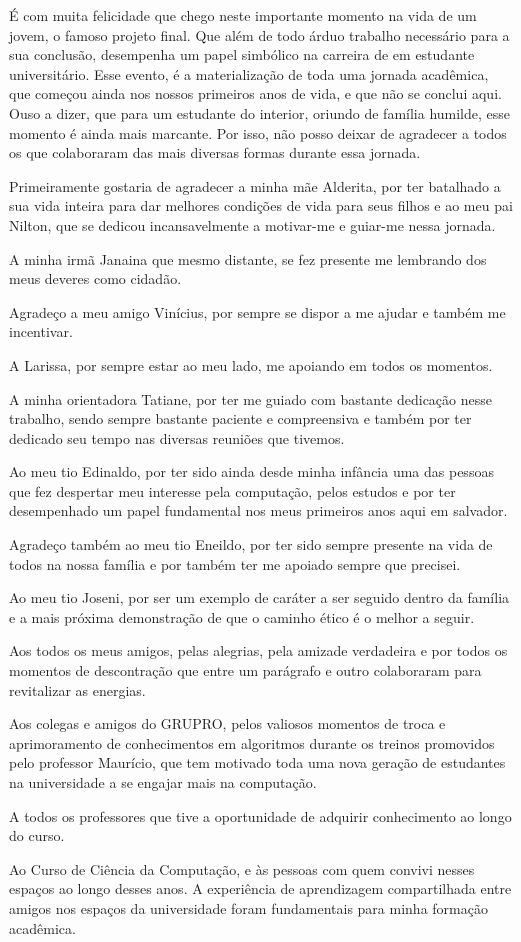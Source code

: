 É com muita felicidade que chego neste importante momento na vida de um jovem, o famoso projeto
final. Que além de todo árduo trabalho necessário para a sua conclusão, desempenha um papel
simbólico na carreira de em estudante universitário. Esse evento, é a materialização de toda uma
jornada acadêmica, que começou ainda nos nossos primeiros anos de vida, e que não se conclui aqui.
Ouso a dizer, que para um estudante do interior, oriundo de família humilde, esse momento é ainda
mais marcante. Por isso, não posso deixar
de agradecer a todos os que colaboraram das mais diversas formas durante essa jornada.

Primeiramente gostaria de agradecer a minha mãe Alderita, por ter batalhado a sua vida inteira para
dar melhores condições de vida para seus filhos e ao meu pai Nilton, que se dedicou incansavelmente a
motivar-me e guiar-me nessa jornada. 

A minha irmã Janaina que mesmo distante, se fez presente me lembrando
dos meus deveres como cidadão.

Agradeço a meu amigo Vinícius, por sempre se dispor a me ajudar e também me incentivar. 

A Larissa, por sempre estar ao meu lado, me apoiando em todos os momentos. 

A minha orientadora Tatiane, por ter me guiado com bastante dedicação nesse trabalho, sendo sempre
bastante paciente e compreensiva e também por ter dedicado seu tempo nas diversas reuniões que
tivemos.

Ao meu tio Edinaldo, por ter sido ainda desde minha infância uma das pessoas que fez despertar meu
interesse pela computação, pelos estudos e por ter desempenhado um papel fundamental nos meus
primeiros anos aqui em salvador.

Agradeço também ao meu tio Eneildo, por ter sido sempre presente na vida de todos na nossa família e
por também ter me apoiado sempre que precisei.

Ao meu tio Joseni, por ser um exemplo de caráter a ser seguido dentro da família e a mais próxima
demonstração de que o caminho ético é o melhor a seguir. 

Aos todos os meus amigos, pelas alegrias, pela amizade verdadeira e por todos os momentos de
descontração que entre um parágrafo e outro colaboraram para revitalizar as energias.

Aos colegas e amigos do GRUPRO, pelos valiosos momentos de troca e aprimoramento de conhecimentos em
algoritmos durante os treinos promovidos pelo professor Maurício, que tem motivado toda uma nova
geração de estudantes na universidade a se engajar mais na computação.

A todos os professores que tive a oportunidade de adquirir conhecimento ao longo do curso.

Ao Curso de Ciência da Computação, e às pessoas com quem convivi nesses espaços ao longo desses
anos. A experiência de aprendizagem compartilhada entre amigos nos espaços da universidade foram
fundamentais para minha formação acadêmica.
